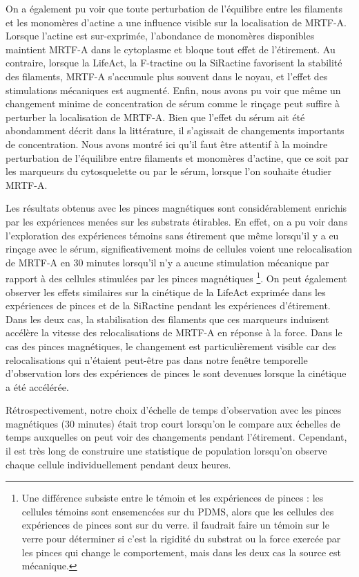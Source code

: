 On a également pu voir que toute perturbation de l'équilibre entre les filaments et les monomères d'actine a une influence visible sur la localisation de MRTF-A. Lorsque l'actine est sur-exprimée, l'abondance de monomères disponibles maintient MRTF-A dans le cytoplasme et bloque tout effet de l'étirement. Au contraire, lorsque la LifeAct, la F-tractine ou la SiRactine favorisent la stabilité des filaments, MRTF-A s'accumule plus souvent dans le noyau, et l'effet des stimulations mécaniques est augmenté. Enfin, nous avons pu voir que même un changement minime de concentration de sérum comme le rinçage peut suffire à perturber la localisation de MRTF-A. Bien que l'effet du sérum ait été abondamment décrit dans la littérature, il s'agissait de changements importants de concentration. Nous avons montré ici qu'il faut être attentif à la moindre perturbation de l'équilibre entre filaments et monomères d'actine, que ce soit par les marqueurs du cytosquelette ou par le sérum, lorsque l'on souhaite étudier MRTF-A. 

Les résultats obtenus avec les pinces magnétiques sont considérablement enrichis par les expériences menées sur les substrats étirables. En effet, on a pu voir dans l'exploration des expériences témoins sans étirement que même lorsqu'il y a eu rinçage avec le sérum, significativement moins de cellules voient une relocalisation de MRTF-A en 30 minutes lorsqu'il n'y a aucune stimulation mécanique par rapport à des cellules stimulées par les pinces magnétiques \footnote{Une différence subsiste entre le témoin et les expériences de pinces : les cellules témoins sont ensemencées sur du PDMS, alors que les cellules des expériences de pinces sont sur du verre. il faudrait faire un témoin sur le verre pour déterminer si c'est la rigidité du substrat ou la force exercée par les pinces qui change le comportement, mais dans les deux cas la source est mécanique. }. On peut également observer les effets similaires sur la cinétique de la LifeAct exprimée dans les expériences de pinces et de la SiRactine pendant les expériences d'étirement. Dans les deux cas, la stabilisation des filaments que ces marqueurs induisent accélère la vitesse des relocalisations de MRTF-A en réponse à la force. Dans le cas des pinces magnétiques, le changement est particulièrement visible car des relocalisations qui n'étaient peut-être pas dans notre fenêtre temporelle d'observation lors des expériences de pinces le sont devenues lorsque la cinétique a été accélérée. 

Rétrospectivement, notre choix d'échelle de temps d'observation avec les pinces magnétiques (30 minutes) était trop court lorsqu'on le compare aux échelles de temps auxquelles on peut voir des changements pendant l'étirement. Cependant, il est très long de construire une statistique de population lorsqu'on observe chaque cellule individuellement pendant deux heures. 

